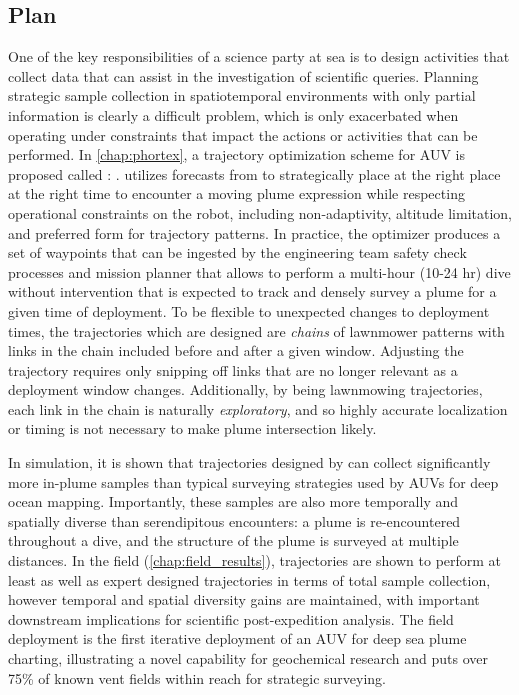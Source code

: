 \subsection{Plan}
One of the key responsibilities of a science party at sea is to design activities that collect data that can assist in the investigation of scientific queries.
Planning strategic sample collection in spatiotemporal environments with only partial information is clearly a difficult problem, which is only exacerbated when operating under constraints that impact the actions or activities that can be performed.
In \cref{chap:phortex}, a trajectory optimization scheme for AUV \Sentry is proposed called \PHORTEX: \phortex.
\PHORTEX utilizes forecasts from \PHUMES to strategically place \Sentry at the right place at the right time to encounter a moving plume expression while respecting operational constraints on the robot, including non-adaptivity, altitude limitation, and preferred form for trajectory patterns.
In practice, the optimizer produces a set of waypoints that can be ingested by the \Sentry engineering team safety check processes and \Sentry mission planner that allows \Sentry to perform a multi-hour (10-24 hr) dive without intervention that is expected to track and densely survey a plume for a given time of deployment.
To be flexible to unexpected changes to deployment times, the trajectories which are designed are \emph{chains} of lawnmower patterns with links in the chain included before and after a given window.
Adjusting the trajectory requires only snipping off links that are no longer relevant as a deployment window changes.
Additionally, by being lawnmowing trajectories, each link in the chain is naturally \emph{exploratory}, and so highly accurate localization or timing is not necessary to make plume intersection likely.

In simulation, it is shown that trajectories designed by \PHORTEX can collect significantly more in-plume samples than typical surveying strategies used by AUVs for deep ocean mapping.
Importantly, these samples are also more temporally and spatially diverse than serendipitous encounters: a plume is re-encountered throughout a dive, and the structure of the plume is surveyed at multiple distances.
In the field (\cref{chap:field_results}), \PHORTEX trajectories are shown to perform at least as well as expert designed trajectories in terms of total sample collection, however temporal and spatial diversity gains are maintained, with important downstream implications for scientific post-expedition analysis.
The field deployment is the first iterative deployment of an AUV for deep sea plume charting, illustrating a novel capability for geochemical research and puts over 75\% of known vent fields \autocite{beaulieu2013authoritative} within reach for strategic surveying.


